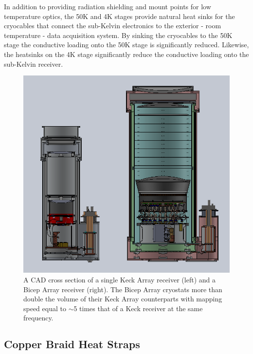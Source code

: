 \documentclass[]{spie}  %
\begin{document}
In addition to providing radiation shielding and mount points for low
temperature optics, the 50K and 4K stages provide natural heat sinks for the
cryocables that connect the sub-Kelvin electronics to the exterior - room
temperature - data acquisition system. By sinking the cryocables to the 50K
stage the conductive loading onto the 50K stage is significantly reduced.
Likewise, the heatsinks on the 4K stage significantly reduce the conductive
loading onto the sub-Kelvin receiver. 




\begin{figure} [ht]
	\begin{center}
		\includegraphics[scale=0.4]{BA_keck_comp.png}
	\end{center}
	\caption{A CAD cross section of a single Keck Array receiver (left) and a
	Bicep Array receiver (right). The Bicep Array cryostats more than double
	the volume of their Keck Array counterparts with mapping speed equal to
	$\sim$5 times that of a Keck receiver at the same frequency.}
	\label{fig:bavskeck}
\end{figure}


\subsection{Copper Braid Heat Straps}
\end{document}
